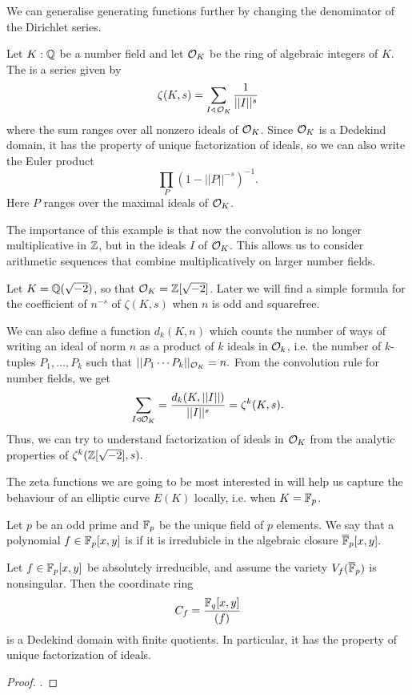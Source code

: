 \documentclass[12pt, a4paper]{report}
\begin{document}
We can generalise generating functions further by changing the denominator of
the Dirichlet series. 

\begin{example}
  Let $K : {\mathbb Q}$ be a number field and let ${\mathcal O}_K$ be the ring of algebraic
  integers of $K$.
  The  is
  a series given by 
  \[\zeta(K,s) = \sum\limits_{I \triangleleft \, {\mathcal O}_K} \frac{1}{||I||^s} \]
  where the sum ranges over all nonzero ideals of ${\mathcal O}_K$.
  Since ${\mathcal O}_K$ is a Dedekind domain, it has the property of unique
  factorization of ideals, so we can also write the Euler product
  \[\prod\limits_P \left( 1-||P||^{-s} \right)^{-1}.\]
  Here $P$ ranges over the maximal ideals of ${\mathcal O}_K$. 
\end{example}

The importance of this example is that now the convolution is no longer
multiplicative in ${\mathbb Z}$, but in the ideals $I$ of ${\mathcal O}_K$. This allows us to
consider arithmetic sequences that combine multiplicatively on larger
number fields.

\begin{example} \label{dedekind_example}
  Let $K = {\mathbb Q}(\sqrt{-2})$, so that ${\mathcal O}_K = {\mathbb Z}[\sqrt{-2}]$. 
  Later we will find a simple formula for the coefficient of $n^{-s}$ of
  $\zeta(K,s)$ when $n$ is odd and squarefree.

  We can also
  define a function $d_k(K,n)$ which counts the number of ways of writing an
  ideal of norm $n$ as a product of $k$ ideals in ${\mathcal O}_k$, i.e. the number of
  $k$-tuples $P_1, \dots, P_k$ such that $||P_1 \cdots P_k||_{{\mathcal O}_K} = n.$
  From the convolution rule for number fields, we get
  \[\sum\limits_{I \triangleleft {\mathcal O}_K} = \frac{d_k(K,||I||)}{||I||^s} =
  \zeta^k(K,s).\]
Thus, we can try to understand factorization of ideals in ${\mathcal O}_K$ from
the analytic properties of $\zeta^k({\mathbb Z}[\sqrt{-2}], s).$
\end{example}

The zeta functions we are going to be most interested in will help us capture
the behaviour of an elliptic curve $E(K)$ locally, i.e. when $K = \mathbb{F}_p$.

Let $p$ be an odd prime and $\mathbb{F}_p$ be the unique field of $p$ elements. We say
that a polynomial $f \in \mathbb{F}_p[x,y]$ is  if it is
irredubicle in the algebraic closure $\overline{\mathbb{F}}_p[x,y].$

\begin{prop}
  Let $f \in \mathbb{F}_p[x,y]$ be absolutely irreducible, and assume the variety
  $V_f(\overline{\mathbb{F}}_p)$ is nonsingular. Then the coordinate ring
  \[C_f = \frac{\mathbb{F}_q[x,y]}{(f)}\]
  is a Dedekind domain with finite quotients. In particular, it has the property
  of unique factorization of ideals.
\end{prop}
\begin{proof}
  \cite[See][Corollary 2.7, page 229]{lorenzini}.
\end{proof}
\end{document}
